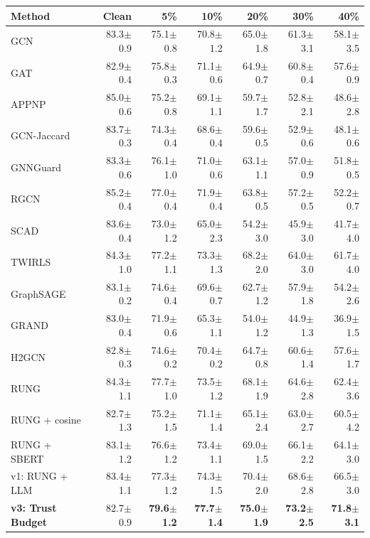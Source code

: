 \documentclass{article}
\newcommand{\score}[2]{#1{\scriptsize$\pm$#2}}
\begin{document}
\begin{center}
\scriptsize
\begin{tabular}{lrrrrrr}
\toprule
Method & Clean & 5\% & 10\% & 20\% & 30\% & 40\% \\
\midrule
GCN & \score{83.3}{0.9} & \score{75.1}{0.8} & \score{70.8}{1.2} & \score{65.0}{1.8} & \score{61.3}{3.1} & \score{58.1}{3.5} \\
GAT & \score{82.9}{0.4} & \score{75.8}{0.3} & \score{71.1}{0.6} & \score{64.9}{0.7} & \score{60.8}{0.4} & \score{57.6}{0.9} \\
APPNP & \score{85.0}{0.6} & \score{75.2}{0.8} & \score{69.1}{1.1} & \score{59.7}{1.7} & \score{52.8}{2.1} & \score{48.6}{2.8} \\
GCN-Jaccard & \score{83.7}{0.3} & \score{74.3}{0.4} & \score{68.6}{0.4} & \score{59.6}{0.5} & \score{52.9}{0.6} & \score{48.1}{0.6} \\
GNNGuard & \score{83.3}{0.6} & \score{76.1}{1.0} & \score{71.0}{0.6} & \score{63.1}{1.1} & \score{57.0}{0.9} & \score{51.8}{0.5} \\
RGCN & \score{85.2}{0.4} & \score{77.0}{0.4} & \score{71.9}{0.4} & \score{63.8}{0.5} & \score{57.2}{0.5} & \score{52.2}{0.7} \\
SCAD & \score{83.6}{0.4} & \score{73.0}{1.2} & \score{65.0}{2.3} & \score{54.2}{3.0} & \score{45.9}{3.0} & \score{41.7}{4.0} \\
TWIRLS & \score{84.3}{1.0} & \score{77.2}{1.1} & \score{73.3}{1.3} & \score{68.2}{2.0} & \score{64.0}{3.0} & \score{61.7}{4.0} \\
GraphSAGE & \score{83.1}{0.2} & \score{74.6}{0.4} & \score{69.6}{0.7} & \score{62.7}{1.2} & \score{57.9}{1.8} & \score{54.2}{2.6} \\
GRAND & \score{83.0}{0.4} & \score{71.9}{0.6} & \score{65.3}{1.1} & \score{54.0}{1.2} & \score{44.9}{1.3} & \score{36.9}{1.5} \\
H2GCN & \score{82.8}{0.3} & \score{74.6}{0.2} & \score{70.4}{0.2} & \score{64.7}{0.8} & \score{60.6}{1.4} & \score{57.6}{1.7} \\
RUNG & \score{84.3}{1.1} & \score{77.7}{1.0} & \score{73.5}{1.2} & \score{68.1}{1.9} & \score{64.6}{2.8} & \score{62.4}{3.6} \\
RUNG + cosine & \score{82.7}{1.3} & \score{75.2}{1.5} & \score{71.1}{1.4} & \score{65.1}{2.4} & \score{63.0}{2.7} & \score{60.5}{4.2} \\
RUNG + SBERT & \score{83.1}{1.2} & \score{76.6}{1.2} & \score{73.4}{1.1} & \score{69.0}{1.5} & \score{66.1}{2.2} & \score{64.1}{3.0} \\
v1: RUNG + LLM & \score{83.4}{1.1} & \score{77.3}{1.2} & \score{74.3}{1.5} & \score{70.4}{2.0} & \score{68.6}{2.8} & \score{66.5}{3.0} \\
\textbf{v3: Trust Budget} & \score{82.7}{0.9} & \textbf{\score{79.6}{1.2}} & \textbf{\score{77.7}{1.4}} & \textbf{\score{75.0}{1.9}} & \textbf{\score{73.2}{2.5}} & \textbf{\score{71.8}{3.1}} \\
\bottomrule
\end{tabular}
\end{center}
\end{document}

